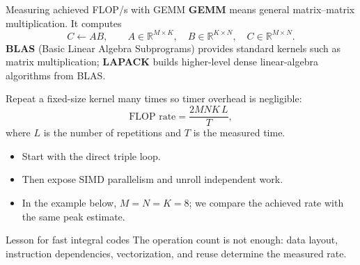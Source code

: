 \documentclass[aspectratio=169,11pt]{beamer}
\begin{document}
\begin{frame}{Measuring achieved FLOP/s with GEMM}
\footnotesize
\textbf{GEMM} means general matrix--matrix multiplication.  It computes
\[
  C\leftarrow AB,
  \qquad A\in\mathbb{R}^{M\times K},\quad
  B\in\mathbb{R}^{K\times N},\quad
  C\in\mathbb{R}^{M\times N}.
\]
\textbf{BLAS} (Basic Linear Algebra Subprograms) provides standard kernels
such as matrix multiplication; \textbf{LAPACK} builds higher-level dense
linear-algebra algorithms from BLAS.

Repeat a fixed-size kernel many times so timer overhead is negligible:
\[
  \text{FLOP rate}=\frac{2MNK\,L}{T},
\]
where $L$ is the number of repetitions and $T$ is the measured time.
\begin{itemize}\setlength{\itemsep}{0pt}
  \item Start with the direct triple loop.
  \item Then expose SIMD parallelism and unroll independent work.
  \item In the example below, $M=N=K=8$; we compare the achieved rate with
        the same peak estimate.
\end{itemize}
\begin{block}{Lesson for fast integral codes}
The operation count is not enough: data layout, instruction dependencies,
vectorization, and reuse determine the measured rate.
\end{block}
\end{frame}
\end{document}
